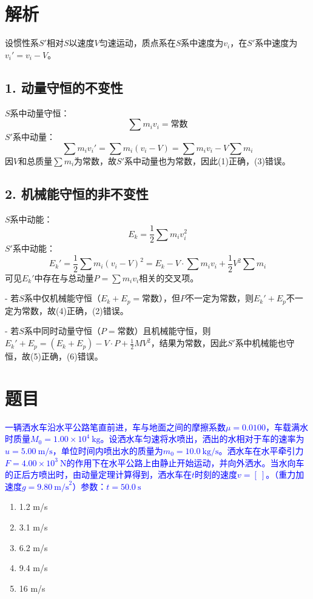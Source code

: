 \documentclass[11pt,a4paper]{article}
\begin{document}
\section*{解析}
设惯性系$S'$相对$S$以速度$V$匀速运动，质点系在$S$系中速度为$v_i$，在$S'$系中速度为$v_i' = v_i - V$。

\subsection*{1. 动量守恒的不变性}
$S$系中动量守恒：
\[
\sum m_i v_i = \text{常数}
\]
$S'$系中动量：
\[
\sum m_i v_i' = \sum m_i (v_i - V) = \sum m_i v_i - V\sum m_i
\]
因$V$和总质量$\sum m_i$为常数，故$S'$系中动量也为常数，因此(1)正确，(3)错误。

\subsection*{2. 机械能守恒的非不变性}
$S$系中动能：
\[
E_k = \frac{1}{2}\sum m_i v_i^2
\]
$S'$系中动能：
\[
E_k' = \frac{1}{2}\sum m_i (v_i - V)^2 = E_k - V \cdot \sum m_i v_i + \frac{1}{2}V^2\sum m_i
\]
可见$E_k'$中存在与总动量$P=\sum m_i v_i$相关的交叉项。

- 若$S$系中仅机械能守恒（$E_k+E_p=\text{常数}$），但$P$不一定为常数，则$E_k'+E_p$不一定为常数，故(4)正确，(2)错误。

- 若$S$系中同时动量守恒（$P=\text{常数}$）且机械能守恒，则$E_k'+E_p = (E_k+E_p) - V \cdot P + \frac{1}{2}MV^2$，结果为常数，因此$S'$系中机械能也守恒，故(5)正确，(6)错误。
\section*{题目}
\textcolor{blue}{一辆洒水车沿水平公路笔直前进，车与地面之间的摩擦系数$\mu=0.0100$，车载满水时质量$M_0=1.00\times10^4\ \text{kg}$。设洒水车匀速将水喷出，洒出的水相对于车的速率为$u=5.00\ \text{m/s}$，单位时间内喷出水的质量为$m_0=10.0\ \text{kg/s}$。洒水车在水平牵引力$F=4.00\times10^3\ \text{N}$的作用下在水平公路上由静止开始运动，并向外洒水。当水向车的正后方喷出时，由动量定理计算得到，洒水车在$t$时刻的速度$v=[\ ]$。（重力加速度$g=9.80\ \text{m/s}^2$）参数：$t=50.0\ \text{s}$}

\begin{enumerate}
    \item[A] 1.2 m/s
    \item[B] 3.1 m/s
    \item[C] 6.2 m/s
    \item[D] 9.4 m/s
    \item[E] 16 m/s
\end{enumerate}
\end{document}
